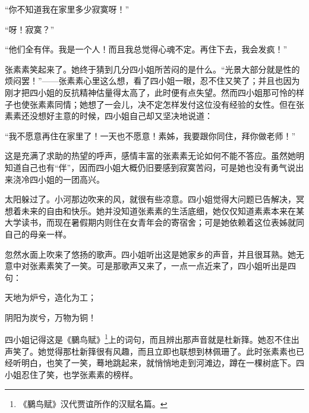 \par “你不知道我在家里多少寂寞呀！”
\par “呀！寂寞？”
\par “他们全有伴。我是一个人！而且我总觉得心魂不定。再住下去，我会发疯！”
\par 张素素笑起来了。她终于猜到几分四小姐所苦闷的是什么。“光景大部分就是性的烦闷罢！”——张素素心里这么想，看了四小姐一眼，忍不住又笑了；并且也因为刚才把四小姐的反抗精神估量得太高了，此时便有点失望。然而四小姐那可怜的样子也使张素素同情；她想了一会儿，决不定怎样发付这位没有经验的女性。但在张素素还没想好主意的时候，四小姐自己却又坚决地说道：
\par “我不愿意再住在家里了！一天也不愿意！素姊，我要跟你同住，拜你做老师！”
\par 这是充满了求助的热望的呼声，感情丰富的张素素无论如何不能不答应。虽然她明知道自己也有“伴”，因而四小姐大概仍旧要感到寂寞苦闷，可是她也没有勇气说出来浇冷四小姐的一团高兴。
\par 太阳躲过了。小河那边吹来的风，就很有些凉意。四小姐觉得大问题已告解决，冥想着未来的自由和快乐。她并没知道张素素的生活底细，她仅仅知道素素本来在某大学读书，而现在暑假期内则住在女青年会的寄宿舍；可是她依赖着这位表姊就同自己的母亲一样。
\par 忽然水面上吹来了悠扬的歌声。四小姐听出这是她家乡的声音，并且很耳熟。她无意中对张素素笑了一笑。可是那歌声又来了，一点一点近来了，四小姐听出是四句：
\par 天地为炉兮，造化为工；
\par 阴阳为炭兮，万物为铜！
\par 四小姐记得这是《鵩鸟赋》\footnote{《鵩鸟赋》汉代贾谊所作的汉赋名篇。}上的词句，而且辨出那声音就是杜新箨。她忍不住出声笑了。她觉得那杜新箨很有风趣，而且立即也联想到林佩珊了。此时张素素也已经听明白，也笑了一笑，蓦地跳起来，就悄悄地走到河滩边，蹲在一棵树底下。四小姐忍住了笑，也学张素素的榜样。

